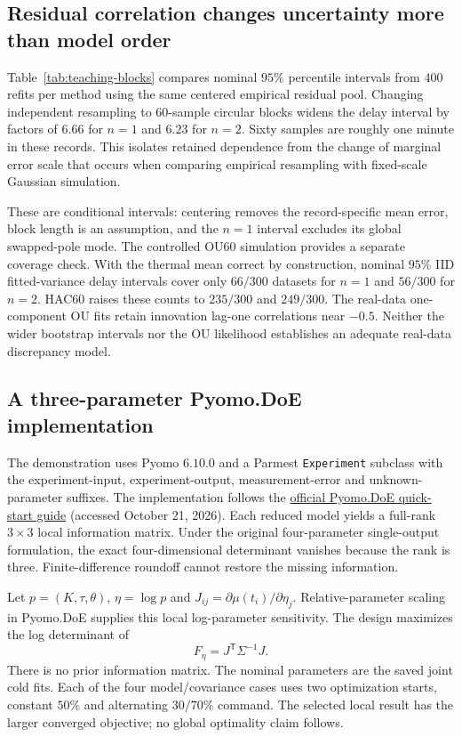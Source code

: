 \subsection{Residual correlation changes uncertainty more than model order}
Table~\ref{tab:teaching-blocks} compares nominal $95\%$ percentile intervals
from $400$ refits per method using the same centered empirical residual pool.
Changing independent resampling to $60$-sample circular blocks widens the delay
interval by factors of $6.66$ for $n=1$ and $6.23$ for $n=2$. Sixty samples
are roughly one minute in these records. This isolates retained dependence
from the change of marginal error scale that occurs when comparing empirical
resampling with fixed-scale Gaussian simulation.


These are conditional intervals: centering removes the record-specific mean
error, block length is an assumption, and the $n=1$ interval excludes its global
swapped-pole mode. The controlled OU60 simulation provides a separate coverage
check. With the thermal mean correct by construction, nominal $95\%$
IID fitted-variance delay intervals cover only $66/300$ datasets for $n=1$
and $56/300$ for $n=2$. HAC60 raises these counts to $235/300$ and $249/300$.
The real-data one-component OU fits retain innovation lag-one correlations near
$-0.5$. Neither the wider bootstrap intervals nor the OU likelihood establishes
an adequate real-data discrepancy model.

\subsection{A three-parameter Pyomo.DoE implementation}
The demonstration uses Pyomo $6.10.0$ and a Parmest \texttt{Experiment} subclass
with the experiment-input, experiment-output, measurement-error and
unknown-parameter suffixes. The implementation follows the
\href{https://pyomo.readthedocs.io/en/stable/explanation/analysis/doe/guide.html}{official Pyomo.DoE quick-start guide}
(accessed October 21, 2026). Each reduced model yields a full-rank $3\times3$
local information matrix. Under the original four-parameter single-output
formulation, the exact four-dimensional determinant vanishes because the rank
is three. Finite-difference roundoff cannot restore the missing information.

Let $p=(K,\tau,\theta)$, $\eta=\log p$ and
$J_{ij}=\partial\mu(t_i)/\partial\eta_j$. Relative-parameter scaling in
Pyomo.DoE supplies this local log-parameter sensitivity. The design maximizes
the log determinant of
\begin{equation}
 F_\eta=J^\mathsf{T}\Sigma^{-1}J.
\end{equation}
There is no prior information matrix. The nominal parameters are the saved joint
cold fits. Each of the four model/covariance cases uses two optimization starts,
constant $50\%$ and alternating $30/70\%$ command. The selected local result
has the larger converged objective; no global optimality claim follows.

